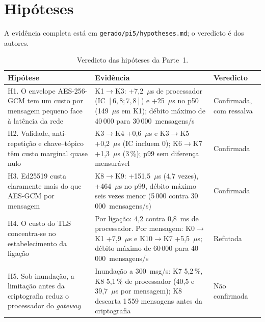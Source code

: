 \section{Hipóteses}
\label{sec:hipoteses}

A evidência completa está em \texttt{gerado/pi5/hypotheses.md}; o veredicto é dos
autores.


\begin{table}[ht]
  \centering
  \caption{Veredicto das hipóteses da Parte~1.}
  \label{tab:hipoteses}
  \footnotesize
  \begin{tabularx}{\textwidth}{@{}L{5.6cm}YL{2.2cm}@{}}
    \toprule
    \textbf{Hipótese} & \textbf{Evidência} & \textbf{Veredicto} \\
    \midrule
    H1. O envelope AES-256-GCM tem um custo por mensagem pequeno face à latência
      da rede & K1$\to$K3: +7,2~$\mu$s de processador (IC $[6{,}8; 7{,}8]$) e
      +25~$\mu$s no p50 (149~$\mu$s em K1); débito máximo de 40\,000 para
      30\,000~mensagens/s & Confirmada, com ressalva \\
    H2. Validade, anti-repetição e chave--tópico têm custo marginal quase nulo &
      K3$\to$K4 +0,6~$\mu$s e K3$\to$K5 +0,2~$\mu$s (IC incluem 0); K6$\to$K7
      +1,3~$\mu$s (3\,\%); p99 sem diferença mensurável & Confirmada \\
    H3. Ed25519 custa claramente mais do que AES-GCM por mensagem &
      K8$\to$K9: +151,5~$\mu$s (4,7 vezes), +464~$\mu$s no p99, débito máximo seis
      vezes menor (5\,000 contra 30\,000~mensagens/s) & Confirmada \\
    H4. O custo do TLS concentra-se no estabelecimento da ligação &
      Por ligação: 4,2 contra 0,8~ms de processador. Por mensagem: K0$\to$K1
      +7,9~$\mu$s e K10$\to$K7 +5,5~$\mu$s; débito máximo de 60\,000 para
      40\,000~mensagens/s & Refutada  \\
    H5. Sob inundação, a limitação antes da criptografia reduz o processador do
      \emph{gateway} & Inundação a 300~msg/s: K7 5,2\,\%, K8 5,1\,\% de
      processador (40,5 e 39,7~$\mu$s por mensagem); K8 descarta 1\,559
      mensagens antes da criptografia & Não confirmada \\
    \bottomrule
  \end{tabularx}
\end{table}

